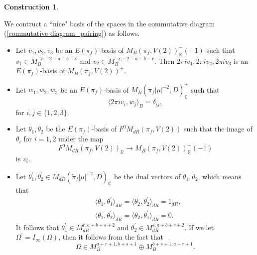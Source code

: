 \documentclass[11pt, a4paper]{amsart}
\theoremstyle{plain}
\theoremstyle{definition}
\newtheorem{construction}[theorem]{Construction}
\numberwithin{equation}{section}
\def\CC{\mathbb{C}}
\def\RR{\mathbb{R}}
\begin{document}
\begin{construction}
\label{construnction: basis for periods}
\par    We contruct a ``nice" basis of the spaces in the commutative diagram (\ref{commutative diagram_pairing}) as follows. 
         \begin{itemize}
             \item Let $v_1, v_2, v_3$ be an $E(\pi_f)$-basis of $M_{B}(\pi_f, V(2))^{-}_{\RR}(-1)$ such that $v_1 \in M_{B}^{-r, -2-a-b-s}$ and $v_2 \in M_{B}^{-s, -2-a-b-r}$. Then $2\pi{i}v_1, 2\pi{i}v_2, 2\pi{i}v_3$ is an $E(\pi_f)$-basis of $M_B(\pi_f, V(2))^{+}$.
             \item Let $w_1, w_2, w_3$ be an $E(\pi_f)$-basis of $M_{B}(\tilde{\pi}_{f}|\mu|^{-2}, D)^{+}_{\CC}$ such that 
                    \begin{equation*}
                        \langle 2\pi{i}v_i, w_j \rangle_{B} = \delta_{ij},
                    \end{equation*}
                    for $i,j \in \{1, 2, 3\}$.
            \item Let $\theta_1, \theta_2$ be the $E(\pi_f)$-basis of  $F^{0}M_{dR}(\pi_f, V(2))$ such that the image of $\theta_{i}$ for $i = 1,2$ under the map
            \begin{equation*}
                 F^{0}M_{dR}(\pi_f, V(2))_{\RR} \rightarrow M_{B}(\pi_f, V(2))^{-}_{\RR}(-1) 
            \end{equation*}
            is $v_i$.
            \item Let $\theta_{1}^{\prime}, \theta_{2}^{\prime} \in M_{dR}(\tilde{\pi}_{f}|\mu|^{-2}, D)_{\CC}$ be the dual vectors of $\theta_1, \theta_2$, which means that 
            \begin{align*}
                & \langle \theta_1, \theta_1^{\prime} \rangle_{dR} = \langle \theta_2, \theta_2^{\prime} \rangle_{dR} = 1_{dR}, \\
                & \langle \theta_1, \theta_2^{\prime} \rangle_{dR} = \langle \theta_2, \theta_1^{\prime} \rangle_{dR} = 0. 
            \end{align*}
            It follows that $\theta_1^{\prime} \in M_{dR}^{r, a + b + s + 2}$ and $\theta_2^{\prime} \in M_{dR}^{s, a + b + r + 2}$. If we let $\Omega^{\prime} = I_{\infty}(\Omega)$, then it follows from the fact that 
            \begin{equation*}
            \Omega \in M_{B}^{a + r + 1, b + s + 1} \oplus M_{B}^{b + s + 1, a + r + 1}.
            \end{equation*}

\end{itemize}
\end{construction}
\end{document}
